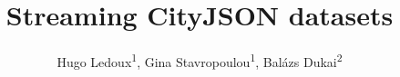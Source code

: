 \documentclass{isprs} %
\begin{document}
\title{Streaming CityJSON datasets}


\author{
 Hugo Ledoux\textsuperscript{1}, Gina Stavropoulou\textsuperscript{1}, Balázs Dukai\textsuperscript{2}}

\address{
	\textsuperscript{1 }Delft University of Technology, the Netherlands---\texttt{[h.ledoux, g.stavropoulou]@tudelft.nl}\\
	\textsuperscript{2 }3DGI, the Netherlands---\texttt{balazs.dukai@3dgi.nl}\\
}


\end{document}
